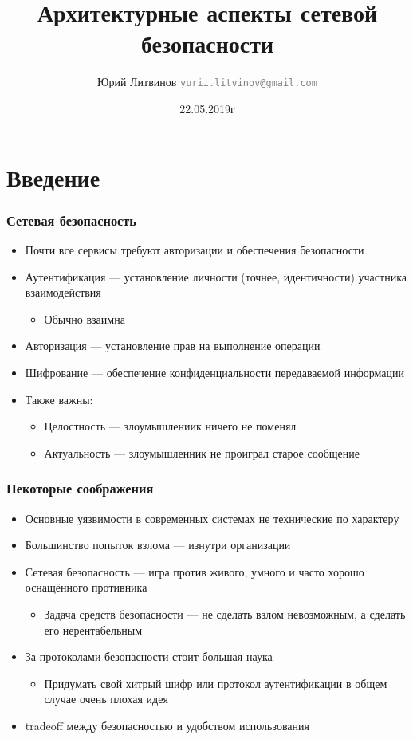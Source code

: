 \documentclass[xetex,mathserif,serif]{beamer}
\title{Архитектурные аспекты сетевой безопасности}
\author[Юрий Литвинов]{Юрий Литвинов \newline \textcolor{gray}{\small\texttt{yurii.litvinov@gmail.com}}}
\date{22.05.2019г}
\begin{document}
	\frame{\titlepage}

	\section{Введение}

	\begin{frame}
		\frametitle{Сетевая безопасность}
		\begin{itemize}
			\item Почти все сервисы требуют авторизации и обеспечения безопасности
			\item Аутентификация --- установление личности (точнее, идентичности) участника взаимодействия
			\begin{itemize}
				\item Обычно взаимна
			\end{itemize}
			\item Авторизация --- установление прав на выполнение операции
			\item Шифрование --- обеспечение конфиденциальности передаваемой информации
			\item Также важны:
			\begin{itemize}
				\item Целостность --- злоумышлениик ничего не поменял
				\item Актуальность --- злоумышленник не проиграл старое сообщение
			\end{itemize} 
		\end{itemize}
	\end{frame}

	\begin{frame}
		\frametitle{Некоторые соображения}
		\begin{itemize}
			\item Основные уязвимости в современных системах не технические по характеру
			\item Большинство попыток взлома --- изнутри организации
			\item Сетевая безопасность --- игра против живого, умного и часто хорошо оснащённого противника
			\begin{itemize}
				\item Задача средств безопасности --- не сделать взлом невозможным, а сделать его нерентабельным
			\end{itemize}
			\item За протоколами безопасности стоит большая наука
			\begin{itemize}
				\item Придумать свой хитрый шифр или протокол аутентификации в общем случае очень плохая идея
			\end{itemize} 
			\item tradeoff между безопасностью и удобством использования
		\end{itemize}
	\end{frame}
\end{document}
